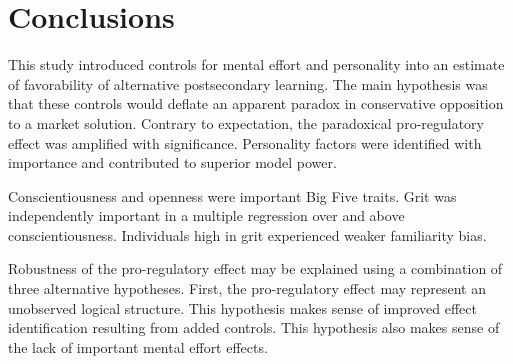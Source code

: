 \documentclass[review]{elsarticle}
\begin{document}

\section{Conclusions}


This study introduced controls for mental effort and personality into an estimate of favorability of alternative postsecondary learning.
The main hypothesis was that these controls would deflate an apparent paradox in conservative opposition to a market solution.
Contrary to expectation, the paradoxical pro-regulatory effect was amplified with significance.
Personality factors were identified with importance and contributed to superior model power.

Conscientiousness and openness were important Big Five traits.
Grit was independently important in a multiple regression over and above conscientiousness.
Individuals high in grit experienced weaker familiarity bias.

Robustness of the pro-regulatory effect may be explained using a combination of three alternative hypotheses.
First, the pro-regulatory effect may represent an unobserved logical structure.
This hypothesis makes sense of improved effect identification resulting from added controls.
This hypothesis also makes sense of the lack of important mental effort effects.
\end{document}

